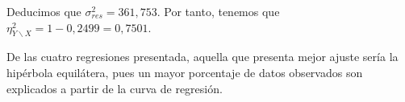 \documentclass{article}
\begin{document}
Deducimos que $\sigma_{res}^2 = 361,753$. Por tanto, tenemos que $\eta_{Y\backslash X}^2 = 1 - 0,2499 = 0,7501$.

De las cuatro regresiones presentada, aquella que presenta mejor ajuste sería la hipérbola equilátera, pues un mayor porcentaje de datos observados son explicados a partir de la curva de regresión.
\end{document}
